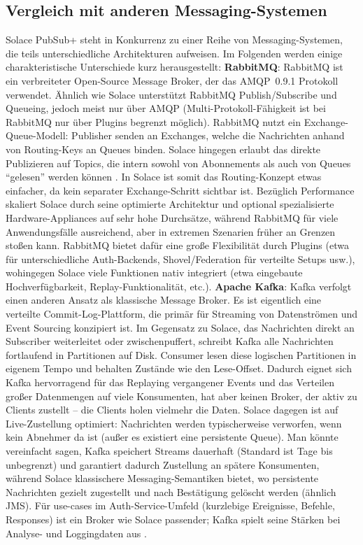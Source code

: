 \subsection{Vergleich mit anderen Messaging-Systemen}
Solace PubSub+ steht in Konkurrenz zu einer Reihe von Messaging-Systemen, die teils unterschiedliche Architekturen aufweisen. Im Folgenden werden einige charakteristische Unterschiede kurz herausgestellt:
\textbf{RabbitMQ}: RabbitMQ ist ein verbreiteter Open-Source Message Broker, der das AMQP 0.9.1 Protokoll verwendet. Ähnlich wie Solace unterstützt RabbitMQ Publish/Subscribe und Queueing, jedoch meist nur über AMQP (Multi-Protokoll-Fähigkeit ist bei RabbitMQ nur über Plugins begrenzt möglich). RabbitMQ nutzt ein Exchange-Queue-Modell: Publisher senden an Exchanges, welche die Nachrichten anhand von Routing-Keys an Queues binden. Solace hingegen erlaubt das direkte Publizieren auf Topics, die intern sowohl von Abonnements als auch von Queues “gelesen” werden können \cite{SolaceTopicWildcard}. In Solace ist somit das Routing-Konzept etwas einfacher, da kein separater Exchange-Schritt sichtbar ist. Bezüglich Performance skaliert Solace durch seine optimierte Architektur und optional spezialisierte Hardware-Appliances auf sehr hohe Durchsätze, während RabbitMQ für viele Anwendungsfälle ausreichend, aber in extremen Szenarien früher an Grenzen stoßen kann. RabbitMQ bietet dafür eine große Flexibilität durch Plugins (etwa für unterschiedliche Auth-Backends, Shovel/Federation für verteilte Setups usw.), wohingegen Solace viele Funktionen nativ integriert (etwa eingebaute Hochverfügbarkeit, Replay-Funktionalität, etc.).
\textbf{Apache Kafka}: Kafka verfolgt einen anderen Ansatz als klassische Message Broker. Es ist eigentlich eine verteilte Commit-Log-Plattform, die primär für Streaming von Datenströmen und Event Sourcing konzipiert ist. Im Gegensatz zu Solace, das Nachrichten direkt an Subscriber weiterleitet oder zwischenpuffert, schreibt Kafka alle Nachrichten fortlaufend in Partitionen auf Disk. Consumer lesen diese logischen Partitionen in eigenem Tempo und behalten Zustände wie den Lese-Offset. Dadurch eignet sich Kafka hervorragend für das Replaying vergangener Events und das Verteilen großer Datenmengen auf viele Konsumenten, hat aber keinen Broker, der aktiv zu Clients zustellt – die Clients holen vielmehr die Daten. Solace dagegen ist auf Live-Zustellung optimiert: Nachrichten werden typischerweise verworfen, wenn kein Abnehmer da ist (außer es existiert eine persistente Queue). Man könnte vereinfacht sagen, Kafka speichert Streams dauerhaft (Standard ist Tage bis unbegrenzt) und garantiert dadurch Zustellung an spätere Konsumenten, während Solace klassischere Messaging-Semantiken bietet, wo persistente Nachrichten gezielt zugestellt und nach Bestätigung gelöscht werden (ähnlich JMS). Für use-cases im Auth-Service-Umfeld (kurzlebige Ereignisse, Befehle, Responses) ist ein Broker wie Solace passender; Kafka spielt seine Stärken bei Analyse- und Loggingdaten aus \cite{Kreps2011}.
